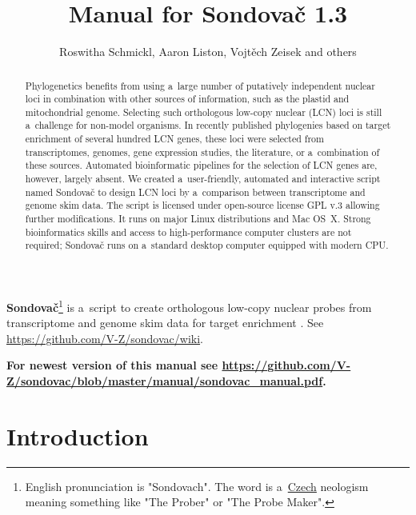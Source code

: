 \documentclass[a4paper, 11pt, twoside]{article}
\title{Manual for Sondovač 1.3} %
\author{Roswitha Schmickl, Aaron Liston, Vojtěch Zeisek and others}
\begin{document}
\maketitle
\textbf{Sondovač}\footnote{English pronunciation is "Sondovach". The word is a~\href{https://en.wikipedia.org/wiki/Czech_language}{Czech} neologism meaning something like "The Prober" or "The Probe Maker".} is a~script to create orthologous low-copy nuclear probes from transcriptome and genome skim data for target enrichment \citep{Schmickl2016}. See \url{https://github.com/V-Z/sondovac/wiki}.

\begin{abstract}
Phylogenetics benefits from using a~large number of putatively independent nuclear loci in combination with other sources of information, such as the plastid and mitochondrial genome. Selecting such orthologous low-copy nuclear (LCN) loci is still a~challenge for non-model organisms. In recently published phylogenies based on target enrichment of several hundred LCN genes, these loci were selected from transcriptomes, genomes, gene expression studies, the literature, or a~combination of these sources. Automated bioinformatic pipelines for the selection of LCN genes are, however, largely absent. We created a~user-friendly, automated and interactive script named Sondovač to design LCN loci by a~comparison between transcriptome and genome skim data. The script is licensed under open-source license GPL v.3 allowing further modifications. It runs on major Linux distributions and Mac OS~X. Strong bioinformatics skills and access to high-performance computer clusters are not required; Sondovač runs on a~standard desktop computer equipped with modern CPU.
\end{abstract}

\tableofcontents
\listoffigures
\listoftables
\vskip 1cm


\vskip 0.75cm

\textbf{For newest version of this manual see \url{https://github.com/V-Z/sondovac/blob/master/manual/sondovac_manual.pdf}.}

\section{Introduction}
\end{document}
